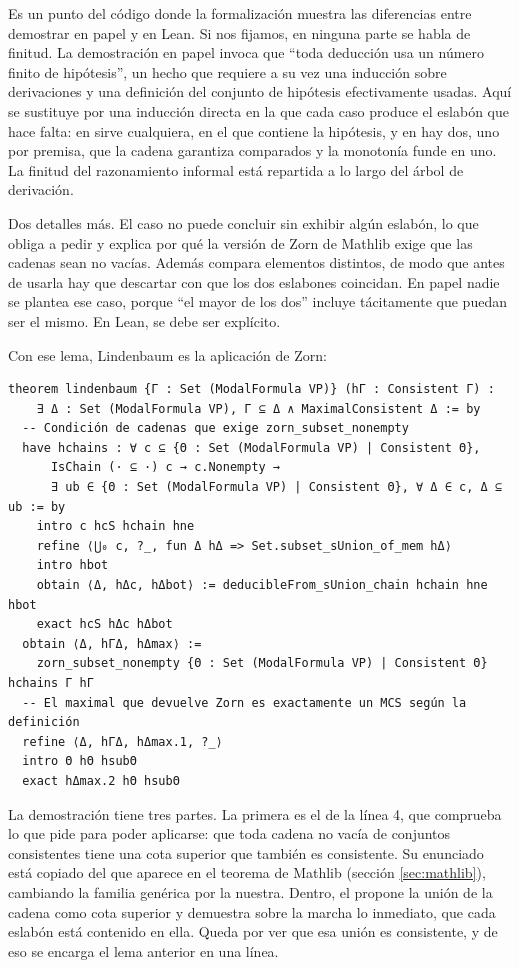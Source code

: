 Es un punto del código donde la formalización muestra las diferencias entre demostrar en papel y en Lean. Si nos fijamos, en ninguna parte se habla de finitud. La demostración en papel invoca que ``toda deducción usa un número finito de hipótesis'', un hecho que requiere a su vez una inducción sobre derivaciones y una definición del conjunto de hipótesis efectivamente usadas. Aquí se sustituye por una inducción directa en la que cada caso produce el eslabón que hace falta: en  sirve cualquiera, en  el que contiene la hipótesis, y en  hay dos, uno por premisa, que la cadena garantiza comparados y la monotonía funde en uno. La finitud del razonamiento informal está repartida a lo largo del árbol de derivación.

Dos detalles más. El caso  no puede concluir sin exhibir algún eslabón, lo que obliga a pedir  y explica por qué la versión de Zorn de Mathlib exige que las cadenas sean no vacías. Además  compara elementos distintos, de modo que antes de usarla hay que descartar con  que los dos eslabones coincidan. En papel nadie se plantea ese caso, porque ``el mayor de los dos'' incluye tácitamente que puedan ser el mismo. En Lean, se debe ser explícito.

Con ese lema, Lindenbaum es la aplicación de Zorn:

\begin{lstlisting}
theorem lindenbaum {Γ : Set (ModalFormula VP)} (hΓ : Consistent Γ) :
    ∃ Δ : Set (ModalFormula VP), Γ ⊆ Δ ∧ MaximalConsistent Δ := by
  -- Condición de cadenas que exige zorn_subset_nonempty
  have hchains : ∀ c ⊆ {Θ : Set (ModalFormula VP) | Consistent Θ},
      IsChain (· ⊆ ·) c → c.Nonempty →
      ∃ ub ∈ {Θ : Set (ModalFormula VP) | Consistent Θ}, ∀ Δ ∈ c, Δ ⊆ ub := by
    intro c hcS hchain hne
    refine ⟨⋃₀ c, ?_, fun Δ hΔ => Set.subset_sUnion_of_mem hΔ⟩
    intro hbot
    obtain ⟨Δ, hΔc, hΔbot⟩ := deducibleFrom_sUnion_chain hchain hne hbot
    exact hcS hΔc hΔbot
  obtain ⟨Δ, hΓΔ, hΔmax⟩ :=
    zorn_subset_nonempty {Θ : Set (ModalFormula VP) | Consistent Θ} hchains Γ hΓ
  -- El maximal que devuelve Zorn es exactamente un MCS según la definición
  refine ⟨Δ, hΓΔ, hΔmax.1, ?_⟩
  intro Θ hΘ hsubΘ
  exact hΔmax.2 hΘ hsubΘ
\end{lstlisting}

La demostración tiene tres partes. La primera es el  de la línea 4, que comprueba lo que  pide para poder aplicarse: que toda cadena no vacía de conjuntos consistentes tiene una cota superior que también es consistente. Su enunciado está copiado del que aparece en el teorema de Mathlib (sección \ref{sec:mathlib}), cambiando la familia genérica por la nuestra. Dentro, el  propone la unión de la cadena como cota superior y demuestra sobre la marcha lo inmediato, que cada eslabón está contenido en ella. Queda por ver que esa unión es consistente, y de eso se encarga el lema anterior en una línea.

